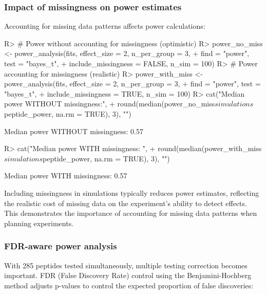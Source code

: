 \documentclass[article]{jss}
\begin{document}
\subsubsection{Impact of missingness on power estimates}

Accounting for missing data patterns affects power calculations:

\begin{Schunk}
\begin{Sinput}
R> # Power without accounting for missingness (optimistic)
R> power_no_miss <- power_analysis(fits, effect_size = 2, n_per_group = 3,
+                                  find = "power", test = "bayes_t",
+                                  include_missingness = FALSE, n_sim = 100)
R> # Power accounting for missingness (realistic)
R> power_with_miss <- power_analysis(fits, effect_size = 2, n_per_group = 3,
+                                    find = "power", test = "bayes_t",
+                                    include_missingness = TRUE, n_sim = 100)
R> cat("Median power WITHOUT missingness:",
+      round(median(power_no_miss$simulations$peptide_power, na.rm = TRUE), 3), "\n")
\end{Sinput}
\begin{Soutput}
Median power WITHOUT missingness: 0.57 
\end{Soutput}
\begin{Sinput}
R> cat("Median power WITH missingness:   ",
+      round(median(power_with_miss$simulations$peptide_power, na.rm = TRUE), 3), "\n")
\end{Sinput}
\begin{Soutput}
Median power WITH missingness:    0.57 
\end{Soutput}
\end{Schunk}

Including missingness in simulations typically reduces power estimates, reflecting the realistic cost of missing data on the experiment's ability to detect effects. This demonstrates the importance of accounting for missing data patterns when planning experiments.

\subsubsection{FDR-aware power analysis}

With 285 peptides tested simultaneously, multiple testing correction becomes important. FDR (False Discovery Rate) control using the Benjamini-Hochberg method adjusts p-values to control the expected proportion of false discoveries:
\end{document}
